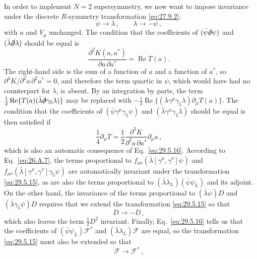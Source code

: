 In order to implement \(N=2\) supersymmetry, we now want to impose invariance
under the discrete \(R\)-symmetry transformation \eqref{eq:27.9.2}:
\begin{equation}
  \psi\longrightarrow\lambda\,,
  \qquad
  \lambda\longrightarrow-\psi\,,
  \tag{29.5.15}\label{eq:29.5.15}
\end{equation}
with \(a\) and \(V_\mu\) unchanged. The condition that the coefficients of
\((\bar\psi\sl{\partial}\psi)\) and
\((\bar\lambda\sl{\partial}\lambda)\) should be equal is
\begin{equation}
  \frac{\partial^2K(a,a^*)}{\partial a\,\partial a^*}
  =\operatorname{Re}T(a).
  \tag{29.5.16}\label{eq:29.5.16}
\end{equation}
The right-hand side is the sum of a function of \(a\) and a function of
\(a^*\), so
\(\partial^4K/\partial^2a\,\partial^2a^*=0\), and therefore the term quartic
in \(\psi\), which would have had no counterpart for \(\lambda\), is absent.
By an integration by parts, the term
\(\tfrac12\operatorname{Re}\{T(a)(\bar\lambda\sl{\partial}\gamma_5\lambda)\}\)
may be replaced with
\(-\tfrac14\operatorname{Re}\{(\bar\lambda\gamma^\mu\gamma_5\lambda)
\partial_\mu T(a)\}\). The condition that the coefficients of
\((\bar\psi\gamma^\mu\gamma_5\psi)\) and
\((\bar\lambda\gamma^\mu\gamma_5\lambda)\) should be equal is then satisfied
if
\[
  \frac14\partial_\mu T
  =\frac12
    \frac{\partial^3K}{\partial^2a\,\partial a^*}\partial_\mu a\,,
\]
which is also an automatic consequence of Eq.~\eqref{eq:29.5.16}.
According to Eq.~\eqref{eq:26.A.7}, the terms proportional to
\(f_{\mu\nu}(\bar\lambda[\gamma^\mu,\gamma^\nu]\psi)\) and
\(f_{\mu\nu}(\bar\lambda[\gamma^\mu,\gamma^\nu]\gamma_5\psi)\) are
automatically invariant under the transformation \eqref{eq:29.5.15}, as are
also the terms proportional to
\((\bar\lambda\lambda_L)(\bar\psi\psi_L)\) and its adjoint. On the other
hand, the invariance of the terms proportional to
\((\bar\lambda\psi)D\) and \((\bar\lambda\gamma_5\psi)D\) requires that we
extend the transformation \eqref{eq:29.5.15} so that
\begin{equation}
  D\longrightarrow-D\,,
  \tag{29.5.17}\label{eq:29.5.17}
\end{equation}
which also leaves the term \(\tfrac12D^2\) invariant. Finally,
Eq.~\eqref{eq:29.5.16} tells us that the coefficients of
\((\bar\psi\psi_L)\mathcal{F}^*\) and
\((\bar\lambda\lambda_L)\mathcal{F}\) are equal, so the transformation
\eqref{eq:29.5.15} must also be extended so that
\begin{equation}
  \mathcal{F}\longrightarrow\mathcal{F}^*\,,
  \tag{29.5.18}\label{eq:29.5.18}
\end{equation}
